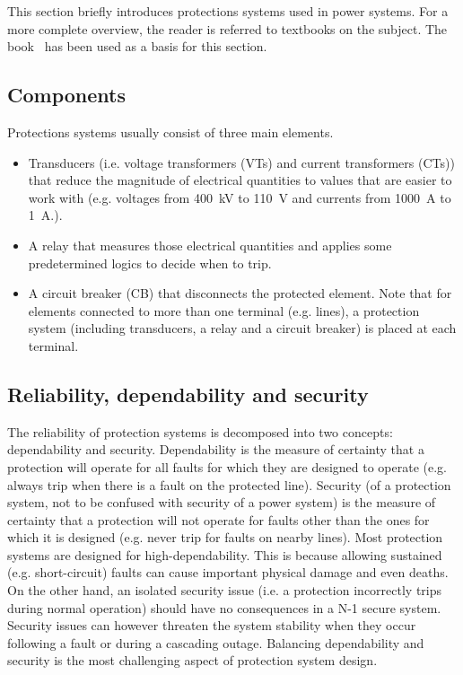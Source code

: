 This section briefly introduces protections systems used in power systems. For a more complete overview, the reader is referred to textbooks on the subject. The book~\cite{HorowitzBook} has been used as a basis for this section.

\subsection{Components}

Protections systems usually consist of three main elements.

\begin{itemize}
    \item Transducers (i.e. voltage transformers (VTs) and current transformers (CTs)) that reduce the magnitude of electrical quantities to values that are easier to work with (e.g. voltages from 400~kV to 110~V and currents from 1000~A to 1~A.).
    \item A relay that measures those electrical quantities and applies some predetermined logics to decide when to trip.
    \item A circuit breaker (CB) that disconnects the protected element. Note that for elements connected to more than one terminal (e.g. lines), a protection system (including transducers, a relay and a circuit breaker) is placed at each terminal.
\end{itemize}

\subsection{Reliability, dependability and security}

The reliability of protection systems is decomposed into two concepts: dependability and security. Dependability is the measure of certainty that a protection will operate for all faults for which they are designed to operate (e.g. always trip when there is a fault on the protected line). Security (of a protection system, not to be confused with security of a power system) is the measure of certainty that a protection will not operate for faults other than the ones for which it is designed (e.g. never trip for faults on nearby lines). Most protection systems are designed for high-dependability. This is because allowing sustained (e.g. short-circuit) faults can cause important physical damage and even deaths. On the other hand, an isolated security issue (i.e. a protection incorrectly trips during normal operation) should have no consequences in a N-1 secure system. Security issues can however threaten the system stability when they occur following a fault or during a cascading outage. Balancing dependability and security is the most challenging aspect of protection system design.

